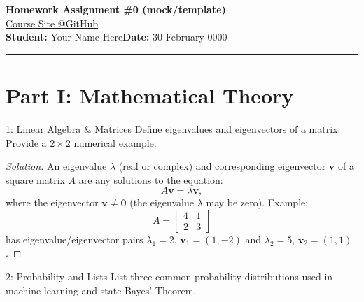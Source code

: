 \documentclass[12pt]{article}
\newcommand{\courseURL}{https://eduenez.github.io/MathAIspring2026UTSA}
\newcommand{\assignmentTitle}{Homework Assignment \#0 (mock/template)}
\newcommand{\studentName}{Your Name Here} %
\begin{document}
\begin{center}
    {\LARGE \textbf{\assignmentTitle}} \\
    \vspace{5pt}
    {\large \href{\courseURL}{Course Site @GitHub}} \\
    \vspace{10pt}
    \textbf{Student:} \studentName \hfill \textbf{Date:} {30 February 0000}\\
    \rule{\linewidth}{0.4pt}
\end{center}

\section*{Part I: Mathematical Theory}

\begin{problem}{1: Linear Algebra \& Matrices}
  Define eigenvalues and eigenvectors of a matrix.
  Provide a $2 \times 2$ numerical example. 
\end{problem}

\begin{proof}[Solution]
An eigenvalue $\lambda$ (real or complex) and corresponding eigenvector $\mathbf{v}$ of a square matrix $A$ are any solutions to the equation:
\begin{equation}
    A\mathbf{v} = \lambda\mathbf{v},
  \end{equation}
  where the eigenvector $\mathbf{v} \ne \mathbf{0}$
  (the eigenvalue $\lambda$ may be zero).
Example:
\[
A = \begin{bmatrix}
4 & 1 \\
2 & 3
\end{bmatrix}
\]
has eigenvalue/eigenvector pairs $\lambda_1 = 2$, $\mathbf{v}_1 = (1, -2)$ and $\lambda_2 = 5$, $\mathbf{v}_2 = (1, 1)$.
\end{proof}

\begin{problem}{2: Probability and Lists}
List three common probability distributions used in machine learning and state Bayes' Theorem.
\end{problem}
\end{document}
